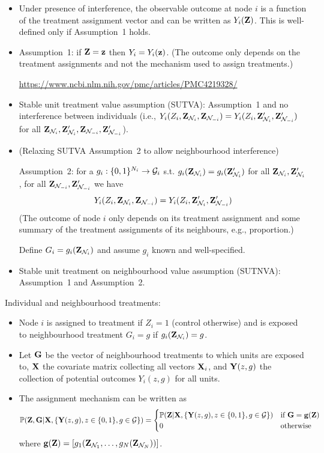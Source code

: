 \documentclass[10pt]{article}
\begin{document}
\begin{itemize}

\item
Under presence of interference, the observable outcome at node $i$ is a function of the treatment assignment vector and can be written as $Y_i(\mathbf{Z})$. This is well-defined only if Assumption~1 holds.

\item
Assumption~1: if $\mathbf{Z}=\mathbf{z}$ then $Y_i=Y_i(\mathbf{z})$. (The outcome only depends on the treatment assignments and not the mechanism used to assign treatments.)

\url{https://www.ncbi.nlm.nih.gov/pmc/articles/PMC4219328/}

\item
Stable unit treatment value assumption (SUTVA): Assumption~1 and no interference between individuals (i.e., $Y_i(Z_i,\mathbf{Z}_{\mathcal{N}_i},\mathbf{Z}_{\mathcal{N}_{-i}})=Y_i(Z_i,\mathbf{Z}_{\mathcal{N}_i}',\mathbf{Z}_{\mathcal{N}_{-i}}')$ for all $\mathbf{Z}_{\mathcal{N}_i},\mathbf{Z}_{\mathcal{N}_i}',\mathbf{Z}_{\mathcal{N}_{-i}},\mathbf{Z}_{\mathcal{N}_{-i}}'$).

\item
(Relaxing SUTVA Assumption~2 to allow neighbourhood interference)

Assumption~2: for a $g_i:\{0,1\}^{N_i}\rightarrow \mathcal{G}_i$ s.t. $g_i(\mathbf{Z}_{\mathcal{N}_i})=g_i(\mathbf{Z}_{\mathcal{N}_i}')$ for all $\mathbf{Z}_{\mathcal{N}_i},\mathbf{Z}_{\mathcal{N}_i}'$, for all $\mathbf{Z}_{\mathcal{N}_{-i}},\mathbf{Z}_{\mathcal{N}_{-i}}'$ we have
\[
Y_i(Z_i,\mathbf{Z}_{\mathcal{N}_i},\mathbf{Z}_{\mathcal{N}_{-i}}) = Y_i(Z_i,\mathbf{Z}_{\mathcal{N}_i}',\mathbf{Z}_{\mathcal{N}_{-i}}')
\]
(The outcome of node $i$ only depends on its treatment assignment and some summary of the treatment assignments of its neighbours, e.g., proportion.)

Define $G_i=g_i(\mathbf{Z}_{\mathcal{N}_i})$ and assume $g_i$ known and well-specified.

\item
Stable unit treatment on neighbourhood value assumption (SUTNVA): Assumption~1 and Assumption~2.

\end{itemize}

Individual and neighbourhood treatments:

\begin{itemize}

\item
Node $i$ is assigned to treatment if $Z_i=1$ (control otherwise) and is exposed to neighbourhood treatment $G_i=g$ if $g_i(\mathbf{Z}_{\mathcal{N}_i})=g$.

\item
Let $\mathbf{G}$ be the vector of neighbourhood treatments to which units are exposed to, $\mathbf{X}$ the covariate matrix collecting all vectors $\mathbf{X}_i$, and $\mathbf{Y}(z,g)$ the collection of potential outcomes $Y_i(z,g)$ for all units.

\item
The assignment mechanism can be written as
\[
\mathbb{P}(\mathbf{Z},\mathbf{G}|\mathbf{X},\{\mathbf{Y}(z,g),z\in\{0,1\},g\in\mathcal{G}\}) =
\begin{cases}
\mathbb{P}(\mathbf{Z}|\mathbf{X},\{\mathbf{Y}(z,g),z\in\{0,1\},g\in\mathcal{G}\}) & \text{if } \mathbf{G}=\mathbf{g}(\mathbf{Z}) \\
0 & \text{otherwise}
\end{cases}
\]
where $\mathbf{g}(\mathbf{Z})=[g_1(\mathbf{Z}_{\mathcal{N}_1},\ldots,g_N(\mathbf{Z}_{\mathcal{N}_N}))]$.

\end{itemize}
\end{document}
